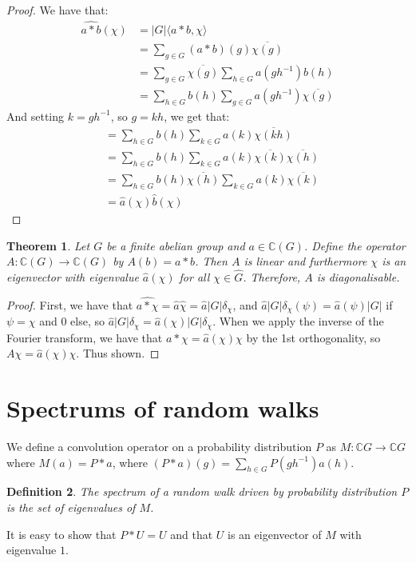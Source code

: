 \documentclass[]{article}
\newtheorem{theorem}{Theorem}
\newtheorem{definition}[theorem]{Definition}
\theoremstyle{definition}
\numberwithin{theorem}{section}
\numberwithin{equation}{section}
\begin{document}
\begin{proof}
	We have that:
\begin{align*}
		\widehat{a \ast b}(\chi) &= |G| \langle a \ast b, \chi \rangle\\
		&= \sum_{g \in G} (a \ast b) (g) \overline{\chi(g)} \\
		&= \sum_{g \in G} \overline{\chi(g)} 
		\sum_{h \in G} a(g h^{-1}) b(h) \\
		&= \sum_{h \in G} b(h)  
		\sum_{g \in G} a(g h^{-1})\overline{\chi(g)}  
\end{align*} 
And setting $k = gh^{-1}$, so $g =kh$, we get that:
\begin{align*}
		&= \sum_{h \in G} b(h)  
		\sum_{k \in G} a(k)\overline{\chi(kh)} \\
		&= \sum_{h \in G} b(h)  
		\sum_{k \in G} a(k)\overline{\chi(k)} \overline{\chi(h)} \\
		&=  \sum_{h \in G} b(h)  \overline{\chi(h)} 
		\sum_{k \in G} a(k)\overline{\chi(k)}\\
		&= \widehat{a}(\chi) \widehat{b}(\chi)
\end{align*}
\end{proof}

\begin{theorem}
	\label{thm:Eigenvector operators}
	Let $G$ be a finite abelian group and $a \in \mathbb{C}(G)$. Define the operator $A: \mathbb{C}(G) \rightarrow \mathbb{C}(G)$ by $A(b) = a \ast b$. Then $A$ is linear and furthermore $\chi$ is an eigenvector with eigenvalue $\widehat{a}(\chi)$ for all $\chi \in \widehat{G}$. Therefore, $A$ is diagonalisable. 
\end{theorem}

\begin{proof}
	First, we have that $\widehat{a\ast \chi} = \widehat{a} \widehat{\chi} = \widehat{a} |G| \delta_\chi$, and $\widehat{a} |G| \delta_\chi(\psi) = \widehat{a}(\psi) |G|$ if $\psi = \chi$ and 0 else, so $\widehat{a} |G| \delta_\chi = \widehat{a}(\chi) |G| \delta_\chi$. When we apply the inverse of the Fourier transform, we have that $a \ast \chi = \widehat{a}(\chi) \chi$ by the 1st orthogonality, so $A \chi = \widehat{a}(\chi) \chi$. Thus shown. 
\end{proof}

\section{Spectrums of random walks}
We define a convolution operator on a probability distribution $P$ as $M : \mathbb{C}G \rightarrow \mathbb{C}G$ where $M(a) = P \ast a$, where $(P \ast a) (g) =\sum_{h\in G} P(gh^{-1})a(h)$.
\begin{definition}
	The spectrum of a random walk driven by probability distribution $P$ is the set of eigenvalues of $M$. 
\end{definition} 
It is easy to show that $P \ast U = U$ and that $U$ is an eigenvector of $M$ with eigenvalue $1$. 
\end{document}
